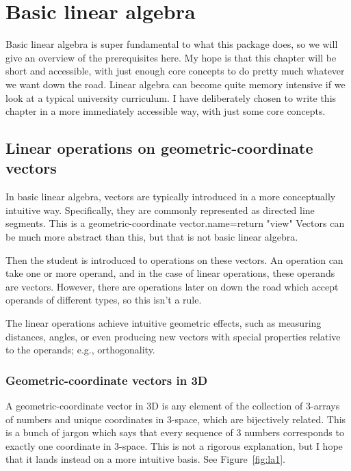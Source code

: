 \chapter{Basic linear algebra}

Basic linear algebra is super fundamental to what this package does,
so we will give an overview of the prerequisites here. My hope is that
this chapter will be short and accessible, with just enough core concepts 
to do pretty much whatever we want down the road. Linear algebra can become 
quite memory intensive if we look at a typical university curriculum. I have 
deliberately chosen to write this chapter in a more immediately accessible
way, with just some core concepts.

\section{Linear operations on geometric-coordinate vectors}

In basic linear algebra, vectors are typically introduced in a more 
conceptually intuitive way. Specifically, they are commonly represented 
as directed line segments. This is a geometric-coordinate vector.name={return "view"}
Vectors can be much more abstract than this,
but that is not basic linear algebra. 

Then the student is introduced to 
operations on these vectors. An operation can take one or more operand,
and in the case of linear operations, these operands are vectors. However,
there are operations later on down the road which accept operands of different 
types, so this isn't a rule. 

The linear operations achieve intuitive geometric effects, such as measuring 
distances, angles, or even producing new vectors with special properties 
relative to the operands; e.g., orthogonality.

\subsection{Geometric-coordinate vectors in 3D}

A geometric-coordinate vector in 3D is any 
element of the collection of 3-arrays of 
numbers and unique coordinates in 3-space, 
which are bijectively related.
This is a bunch of jargon which says that 
every sequence of 3 numbers 
corresponds to exactly one coordinate in 
3-space. This is not a rigorous explanation,
but I hope that it lands instead on a more 
intuitive basis. See Figure~\ref{fig:la1}.

